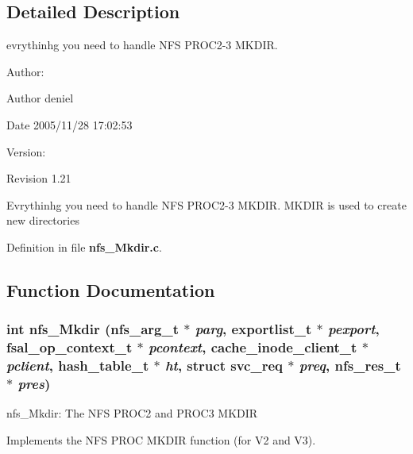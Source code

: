 \subsection{Detailed Description}
evrythinhg you need to handle NFS PROC2-3 MKDIR. 

\begin{Desc}
\item[Author:]\end{Desc}
\begin{Desc}
\item[Author]deniel \end{Desc}
\begin{Desc}
\item[Date]2005/11/28 17:02:53 \end{Desc}
\begin{Desc}
\item[Version:]\end{Desc}
\begin{Desc}
\item[Revision]1.21 \end{Desc}
Evrythinhg you need to handle NFS PROC2-3 MKDIR. MKDIR is used to create new directories 

Definition in file {\bf nfs\_\-Mkdir.c}.

\subsection{Function Documentation}
\subsubsection[{nfs\_\-Mkdir}]{\setlength{\rightskip}{0pt plus 5cm}int nfs\_\-Mkdir (nfs\_\-arg\_\-t $\ast$ {\em parg}, \/  exportlist\_\-t $\ast$ {\em pexport}, \/  fsal\_\-op\_\-context\_\-t $\ast$ {\em pcontext}, \/  cache\_\-inode\_\-client\_\-t $\ast$ {\em pclient}, \/  hash\_\-table\_\-t $\ast$ {\em ht}, \/  struct svc\_\-req $\ast$ {\em preq}, \/  nfs\_\-res\_\-t $\ast$ {\em pres})}\label{nfs__Mkdir_8c_3bf6d6f1c1a726410918bf3edfa34fc3}


nfs\_\-Mkdir: The NFS PROC2 and PROC3 MKDIR

Implements the NFS PROC MKDIR function (for V2 and V3).

